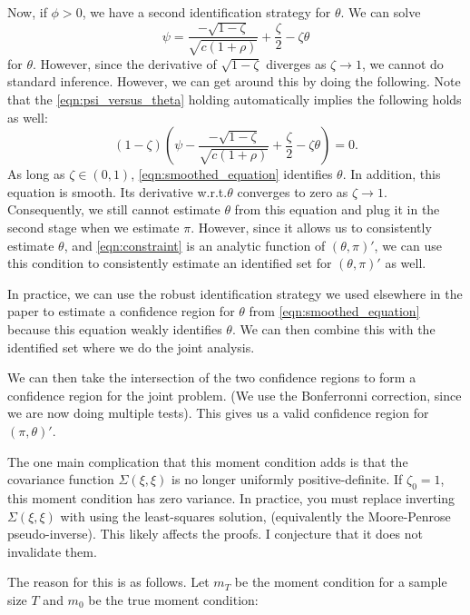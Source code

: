 \documentclass[11pt, letterpaper, twoside, final]{article}
\begin{document}
Now, if $\phi > 0$, we have a second identification strategy for $\theta$. 
We can solve 
\begin{equation}
    \label{eqn:psi_versus_theta}
    \psi = \frac{-\sqrt{1-\zeta}}{\sqrt{c(1+\rho)}} + \frac{\zeta}{2} - \zeta \theta
\end{equation}
%
for $\theta$.
However, since the derivative of $\sqrt{1-\zeta}$ diverges as $\zeta \to 1$, we cannot do standard inference.
However, we can get around this by doing the following.
%
Note that the \cref{eqn:psi_versus_theta} holding automatically implies the following holds as well: 
%
\begin{equation}
    \label{eqn:smoothed_equation}
    (1-\zeta)\left(\psi - \frac{-\sqrt{1-\zeta}}{\sqrt{c(1+\rho)}} + \frac{\zeta}{2} - \zeta \theta\right) = 0.
\end{equation}
%
As long as $\zeta \in (0, 1)$, \cref{eqn:smoothed_equation} identifies $\theta$.  
In addition, this equation is smooth. 
Its derivative w.r.t.\@ $\theta$ converges to zero as $\zeta \to 1$.
Consequently, we still cannot estimate $\theta$ from this equation and plug it in the second stage when we
estimate $\pi$. 
However, since it allows us to consistently estimate $\theta$, and \cref{eqn:constraint}  is an analytic  function
of $(\theta, \pi)'$, we can use this condition to consistently estimate an identified set for $(\theta, \pi)'$ as
well.

In practice, we can use the robust identification strategy we used elsewhere in the paper to estimate a confidence
region for $\theta$ from \cref{eqn:smoothed_equation} because this equation weakly identifies $\theta$.
We can then combine this with the identified set where we do the joint analysis.

We can then take the intersection of the two confidence regions to form a confidence region for the joint problem.
(We use the Bonferronni correction, since we are now doing multiple tests).
This gives us a valid confidence region for $(\pi, \theta)'$.

The one main complication that this moment condition adds is that the covariance function $\Sigma(\xi, \xi )$ is
no longer uniformly positive-definite.
If $\zeta_0 = 1$, this moment condition has zero variance.
In practice, you must replace inverting $\Sigma(\xi, \xi)$ with using the least-squares solution, (equivalently
the Moore-Penrose pseudo-inverse). 
This likely affects the proofs. 
I conjecture that it does not invalidate them.

The reason for this is as follows.
Let $m_T$ be the moment condition for a sample size $T$ and $m_0$ be the true moment condition:
\end{document}
